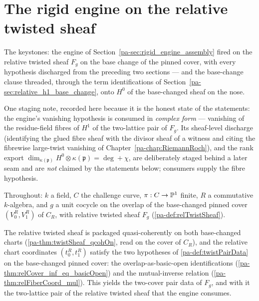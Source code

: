 \section{The rigid engine on the relative twisted sheaf}
\label{pa-sec:rel_twist_rigid_engine}

The keystones: the engine of Section~\ref{pa-sec:rigid_engine_assembly} fired on the
relative twisted sheaf \(F_g\) on the base change of the pinned cover, with every
hypothesis discharged from the preceding two sections --- and the base-change clause
threaded, through the term identifications of Section~\ref{pa-sec:relative_h1_base_change},
onto \(H^0\) of the base-changed sheaf on the nose.

One staging note, recorded here because it is the honest state of the statements: the
engine's vanishing hypothesis is consumed in \emph{complex form} --- vanishing of the
residue-field fibres of \(H^1\) of the two-lattice pair of \(F_g\). Its sheaf-level
discharge (identifying the glued fibre sheaf with the divisor sheaf of a witness and
citing the fibrewise large-twist vanishing of Chapter~\ref{pa-chap:RiemannRoch}), and the
rank export \(\dim_{\kappa(\mathfrak p)} H^0 \otimes \kappa(\mathfrak p) = \deg +
\chi\), are deliberately staged behind a later seam and are \emph{not} claimed by the
statements below; consumers supply the fibre hypothesis.

Throughout: \(k\) a field, \(C\) the challenge curve, \(\pi : C \to \mathbb{P}^1\) finite,
\(R\) a commutative \(k\)-algebra, and \(g\) a unit cocycle on the overlap of the
base-changed pinned cover \((V_0^R, V_1^R)\) of \(C_R\), with relative twisted sheaf
\(F_g\) (\ref{pa-def:relTwistSheaf}).

\begin{definition}
  \label{pa-def:relTwistPairData}
  \leanok

  The relative twisted sheaf is packaged quasi-coherently on both base-changed charts
  (\ref{pa-thm:twistSheaf_qcohOn}, read on the cover of \(C_R\)), and the relative chart
  coordinates \((t_0^R, t_1^R)\) satisfy the two hypotheses of \ref{pa-def:twistPairData}
  on the base-changed pinned cover: the overlap-as-basic-open identifications
  (\ref{pa-thm:relCover_inf_eq_basicOpen}) and the mutual-inverse relation
  (\ref{pa-thm:relFiberCoord_mul}). This yields the two-cover pair data of \(F_g\), and
  with it the two-lattice pair of the relative twisted sheaf that the engine consumes.
\end{definition}

